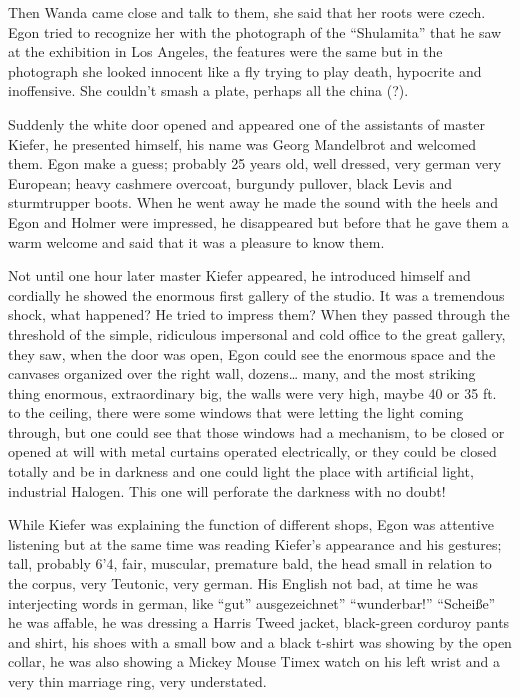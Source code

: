 \documentclass[smalldemyvopaper,11pt,twoside,onecolumn,openright,extrafontsizes]{memoir}
\begin{document}
Then Wanda came close and talk to them, she said that her roots were czech. Egon tried to recognize her with the photograph of the “Shulamita” that he saw at the exhibition in Los Angeles, the features were the same but in the photograph she looked innocent like a fly trying to play death, hypocrite and inoffensive. She couldn’t smash a plate, perhaps all the china (?).

Suddenly the white door opened and appeared one of the assistants of master Kiefer, he presented himself, his name was Georg Mandelbrot and welcomed them. Egon make a guess; probably 25 years old, well dressed, very german very European; heavy cashmere overcoat, burgundy pullover, black Levis and sturmtrupper boots. When he went away he made the sound with the heels and Egon and Holmer were impressed, he disappeared but before that he gave them a warm welcome and said that it was a pleasure to know them. 

Not until one hour later master Kiefer appeared, he introduced himself and cordially he showed the enormous first gallery of the studio. It was a tremendous shock, what happened? He tried to impress them? When they passed through the threshold of the simple, ridiculous impersonal and cold office to the great gallery, they saw, when the door was open, Egon could see the enormous space and the canvases organized over the right wall, dozens… many, and the most striking thing enormous, extraordinary big, the walls were very high, maybe 40 or 35 ft. to the ceiling, there were some windows that were letting the light coming through, but one could see that those windows had a mechanism, to be closed or opened at will with metal curtains operated electrically, or they could be closed totally and be in darkness and one could light the place with artificial light, industrial Halogen. This one will perforate the darkness with no doubt!

While Kiefer was explaining the function of different shops, Egon was attentive listening but at the same time was reading Kiefer’s appearance and his gestures; tall, probably 6’4, fair, muscular, premature bald, the head small in relation to the corpus, very Teutonic, very german. His English not bad, at time he was interjecting words in german, like “gut” ausgezeichnet” “wunderbar!” “Scheiße”  he was affable, he was dressing a Harris Tweed jacket, black-green corduroy pants and shirt, his shoes with a small bow and a black t-shirt was showing by the open collar, he was also showing a Mickey Mouse Timex watch on his left wrist and a very thin marriage ring, very understated.
\end{document}
